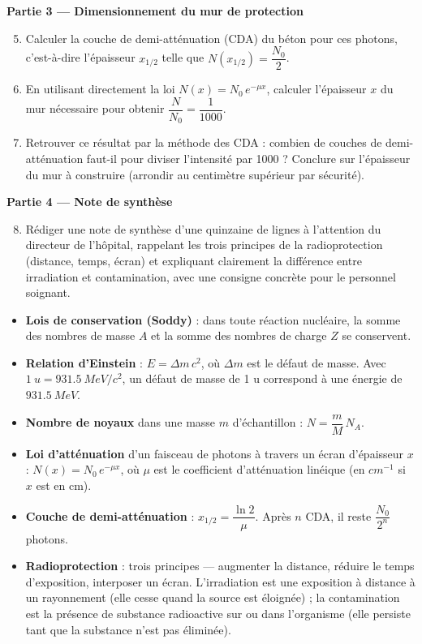 \documentclass[11pt]{article}
\newcommand{\cle}[1]{{\popxbold\color{popdark}#1}}
\newcounter{popsec}
\newcounter{popsub}
\newcommand{\courssub}[1]{%
  \stepcounter{popsub}%
  \par\vspace{9pt}\noindent{\popxbold\fontsize{11.5}{13}\selectfont\color{popink}{\color{poporange}\thepopsec.\thepopsub}\hspace{6pt}#1}\par\nopagebreak\vspace{4pt}
}
\begin{document}
\textbf{Partie 3 — Dimensionnement du mur de protection}

\begin{enumerate}
\setcounter{enumi}{4}
\item Calculer la couche de demi-atténuation (CDA) du béton pour ces photons, c'est-à-dire l'épaisseur $x_{1/2}$ telle que $N(x_{1/2}) = \dfrac{N_{0}}{2}$.
\item En utilisant directement la loi $N(x) = N_{0}\,e^{-\mu x}$, calculer l'épaisseur $x$ du mur nécessaire pour obtenir $\dfrac{N}{N_{0}} = \dfrac{1}{1000}$.
\item Retrouver ce résultat par la méthode des CDA : combien de couches de demi-atténuation faut-il pour diviser l'intensité par 1000 ? Conclure sur l'épaisseur du mur à construire (arrondir au centimètre supérieur par sécurité).
\end{enumerate}

\textbf{Partie 4 — Note de synthèse}

\begin{enumerate}
\setcounter{enumi}{7}
\item Rédiger une note de synthèse d'une quinzaine de lignes à l'attention du directeur de l'hôpital, rappelant les trois principes de la radioprotection (distance, temps, écran) et expliquant clairement la différence entre irradiation et contamination, avec une consigne concrète pour le personnel soignant.
\end{enumerate}

\courssub{Ressources à mobiliser}

\begin{aretenir}
\begin{itemize}
\item \textbf{Lois de conservation (Soddy)} : dans toute réaction nucléaire, la somme des nombres de masse $A$ et la somme des nombres de charge $Z$ se conservent.
\item \textbf{Relation d'Einstein} : $E = \Delta m\,c^{2}$, où $\Delta m$ est le défaut de masse. Avec $\SI{1}{u} = \SI{931,5}{MeV/c^{2}}$, un défaut de masse de 1 u correspond à une énergie de $\SI{931,5}{MeV}$.
\item \textbf{Nombre de noyaux} dans une masse $m$ d'échantillon : $N = \dfrac{m}{M}\,N_{A}$.
\item \textbf{Loi d'atténuation} d'un faisceau de photons à travers un écran d'épaisseur $x$ : $N(x) = N_{0}\,e^{-\mu x}$, où $\mu$ est le coefficient d'atténuation linéique (en $\si{cm^{-1}}$ si $x$ est en cm).
\item \textbf{Couche de demi-atténuation} : $x_{1/2} = \dfrac{\ln 2}{\mu}$. Après $n$ CDA, il reste $\dfrac{N_{0}}{2^{n}}$ photons.
\item \textbf{Radioprotection} : trois principes — augmenter la \cle{distance}, réduire le \cle{temps} d'exposition, interposer un \cle{écran}. L'\cle{irradiation} est une exposition à distance à un rayonnement (elle cesse quand la source est éloignée) ; la \cle{contamination} est la présence de substance radioactive sur ou dans l'organisme (elle persiste tant que la substance n'est pas éliminée).
\end{itemize}
\end{aretenir}
\end{document}
